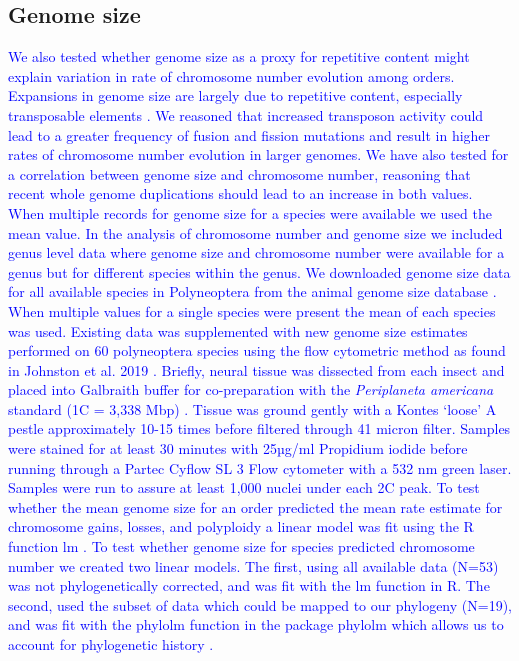 \documentclass[]{rsos}%
\begin{document}
\subsection{Genome size}
\textcolor{blue}{We also tested whether genome size as a proxy for repetitive content might explain variation in rate of chromosome number evolution among orders. 
Expansions in genome size are largely due to repetitive content, especially transposable elements \cite{kidwell2002transposable,bennetzen2005mechanisms}.
We reasoned that increased transposon activity could lead to a greater frequency of fusion and fission mutations and result in higher rates of chromosome number evolution in larger genomes.
We have also tested for a correlation between genome size and chromosome number, reasoning that recent whole genome duplications should lead to an increase in both values.
When multiple records for genome size for a species were available we used the mean value.
In the analysis of chromosome number and genome size we included genus level data where genome size and chromosome number were available for a genus but for different species within the genus.
We downloaded genome size data for all available species in Polyneoptera from the animal genome size database \cite{gregory2019}.
When multiple values for a single species were present the mean of each species was used.
Existing data was supplemented with new genome size estimates performed on 60 polyneoptera species using the flow cytometric method as found in Johnston et al. 2019 \cite{johnston2019}. 
Briefly, neural tissue was dissected from each insect and placed into Galbraith buffer for co-preparation with the \textit{Periplaneta americana} standard (1C = 3,338 Mbp) \cite{hanrahan2011}.
Tissue was ground gently with a Kontes ‘loose’ A pestle approximately 10-15 times before filtered through 41 micron filter.  Samples were stained for at least 30 minutes with 25µg/ml Propidium iodide before running through a Partec Cyflow SL 3 Flow cytometer with a 532 nm green laser. 
Samples were run to assure at least 1,000 nuclei under each 2C peak.
To test whether the mean genome size for an order predicted the mean rate estimate for chromosome gains, losses, and polyploidy a linear model was fit using the R function lm \cite{R-citation}.
To test whether genome size for species predicted chromosome number we created two linear models. 
The first, using all available data (N=53) was not phylogenetically corrected, and was fit with the lm function in R.
The second, used the subset of data which could be mapped to our phylogeny (N=19), and was fit with the phylolm function in the package phylolm which allows us to account for phylogenetic history \cite{R-citation, phylolm}.}
\end{document}
